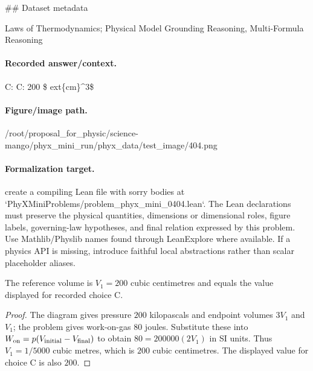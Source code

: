 \#\# Dataset metadata

Laws of Thermodynamics; Physical Model Grounding Reasoning, Multi-Formula Reasoning

\paragraph{Recorded answer/context.}
C: C: 200 \$	ext\{cm\}\textasciicircum{}3\$

\paragraph{Figure/image path.}
/root/proposal\_for\_physic/science-mango/phyx\_mini\_run/phyx\_data/test\_image/404.png

\paragraph{Formalization target.}
create a compiling Lean file with sorry bodies at `PhyXMiniProblems/problem\_phyx\_mini\_0404.lean`. The Lean declarations must preserve the physical quantities, dimensions or dimensional roles, figure labels, governing-law hypotheses, and final relation expressed by this problem.
Use Mathlib/Physlib names found through LeanExplore where available. If a physics API is missing, introduce faithful local abstractions rather than scalar placeholder aliases.

\begin{theorem}
\label{thm:physics:phyx_mini_0404:target}
The reference volume is $V_1=200$ cubic centimetres and equals the value displayed for recorded choice C.
\end{theorem}
\begin{proof}
The diagram gives pressure $200$ kilopascals and endpoint volumes $3V_1$ and $V_1$; the problem gives work-on-gas $80$ joules.  Substitute these into $W_{\rm on}=p(V_{\rm initial}-V_{\rm final})$ to obtain $80=200000(2V_1)$ in SI units.  Thus $V_1=1/5000$ cubic metres, which is $200$ cubic centimetres.  The displayed value for choice C is also $200$.
\end{proof}

